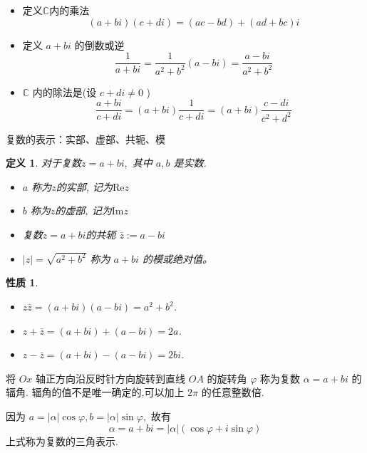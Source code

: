 \documentclass[13pt]{beamer}
\newtheorem*{defi}{定义}
\newtheorem*{prop}{性质}
\begin{document}
\begin{frame}
\begin{itemize}
	\item 定义$\mathbb{C}$内的乘法
\[
(a+b i)(c+d i) =(a c-b d)+(a d+b c) i
\]

\item 定义 $a+b {i}$ 的倒数或逆
\[
\frac{1}{a+b i}=\frac{1}{a^{2}+b^{2}}(a-b i)=\frac{a-b i}{a^{2}+b^{2}}
\]
\item  $\mathbb{C}$ 内的除法是(设 $c+d {i} \neq 0$ )
\[
\frac{a+b i}{c+d i}=(a+b i) \frac{1}{c+d i}=(a+b i) \frac{c-d i}{c^{2}+d^{2}}
\]
\end{itemize}
\end{frame}

\begin{frame}{复数的表示：实部、虚部、共轭、模}

\begin{defi}
对于复数$z=a+b i,$ 其中 $a, b$ 是实数.

\begin{itemize}
\item $a$ 称为$z$的\alert{实部}, 记为$\text{Re} z$

\item $b$ 称为$z$的\alert{虚部}, 记为$\text{Im}  z$

\item 复数$z=a+b i$的\alert{共轭} $\bar{z}:=a-bi$ 
\item  $|z|=\sqrt{a^{2}+b^{2}}$ 称为 $a+b i$ 的\alert{模}或绝对值。
\end{itemize}
\end{defi}
\begin{prop}
\begin{itemize}
	\item $z  \bar{z}=(a+b i)(a-b i)=a^{2}+b^{2}$.
	\item $z+\bar{z}=(a+b i)+(a-b i)=2 a$.
	\item $z-\bar{z}=(a+b i)-(a-b i)=2 b i$.
\end{itemize}
\end{prop}
\end{frame}



\begin{frame}
将 $Ox$ 轴正方向沿反时针方向旋转到直线 $OA$ 的旋转角 $\varphi$ 称为复数 $\alpha=a+b {i}$ 的\alert{辐角}. 辐角的值不是唯一确定的,可以加上 $2 \pi$ 的任意整数倍. 

因为 $a=|\alpha| \cos \varphi, b=|\alpha| \sin \varphi,$ 故有
\[
\alpha=a+b {i}=|\alpha|(\cos \varphi+{i} \sin \varphi)
\]
上式称为复数的三角表示. 
\begin{center}
\end{center}
\end{frame}
\end{document}
